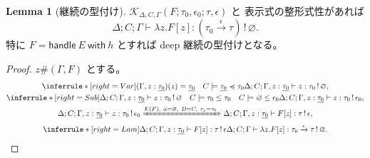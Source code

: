 \documentclass[a4paper,11pt]{article}
\theoremstyle{definition}
\newtheorem{lemma}[definition]{Lemma}
\newcommand{\emp}{\varnothing}
\newcommand{\arr}[3]{#1\xrightarrow{#2}#3}
\newcommand{\jj}[6]{#1;#2;#3\vdash #4:#5\,!\,#6}
\newcommand{\J}[3]{\jj{\Delta}{C}{\Gamma}{#1}{#2}{#3}}
\newcommand{\inst}[2]{#1\preccurlyeq #2}
\newcommand{\handle}[2]{\mathsf{handle}\ #1\ \mathsf{with}\ #2}
\newcommand{\mono}[1]{\underline{#1}}
\newcommand{\proofspace}{\Needspace{16\baselineskip}}
\begin{document}
\proofspace
\begin{samepage}
\begin{lemma}[継続の型付け]\label{lem:resume}
$\mathcal K_{\Delta,C,\Gamma}(F;\tau_0,\epsilon_0;\tau,\epsilon)$ と
表示式の整形式性があれば
\[
 \J{\lambda z.F[z]}{(\arr{\tau_0}\epsilon\tau)}\emp.
\]
特に $F=\handle E h$ とすれば deep 継続の型付けとなる。
\end{lemma}
\end{samepage}
\nopagebreak[4]
\begin{proof}\leavevmode\label{proof:lem:resume}
$z\#(\Gamma,F)$ とする。
\begin{gather*}
 \inferrule*[right=Var]{(\Gamma,z:\mono{\tau_0})(z)=\mono{\tau_0}\quad
                        C\models\inst{\mono{\tau_0}}{\tau_0}}
       {\jj\Delta C{\Gamma,z:\mono{\tau_0}}z{\tau_0}\emp},\\
 \inferrule*[right=Sub]{\jj\Delta C{\Gamma,z:\mono{\tau_0}}z{\tau_0}\emp\quad
                        C\models\tau_0\leq\tau_0\quad C\models\emp\leq\epsilon_0}
       {\jj\Delta C{\Gamma,z:\mono{\tau_0}}z{\tau_0}{\epsilon_0}},\\
 \jj\Delta C{\Gamma,z:\mono{\tau_0}}z{\tau_0}{\epsilon_0}
 \xRightarrow{\mathcal K(F),\ \bar\alpha=\emp,\ D=C,\ \tau_z=\tau_0}
 \jj\Delta C{\Gamma,z:\mono{\tau_0}}{F[z]}\tau\epsilon,\\
 \inferrule*[right=Lam]{\jj\Delta C{\Gamma,z:\mono{\tau_0}}{F[z]}\tau\epsilon}
       {\jj\Delta C\Gamma{\lambda z.F[z]}{\arr{\tau_0}\epsilon\tau}\emp}.
\end{gather*}
\end{proof}
\end{document}
